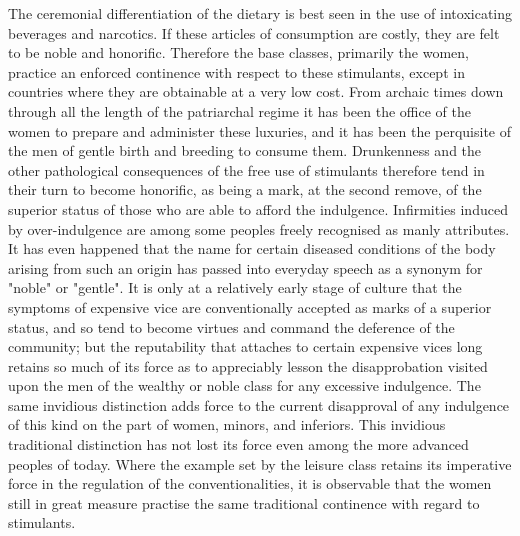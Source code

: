 \documentclass[12pt]{report}
\begin{document}
The ceremonial differentiation of the dietary is best seen in the use of
intoxicating beverages and narcotics. If these articles of consumption
are costly, they are felt to be noble and honorific. Therefore the
base classes, primarily the women, practice an enforced continence
with respect to these stimulants, except in countries where they are
obtainable at a very low cost. From archaic times down through all the
length of the patriarchal regime it has been the office of the women to
prepare and administer these luxuries, and it has been the perquisite
of the men of gentle birth and breeding to consume them. Drunkenness
and the other pathological consequences of the free use of stimulants
therefore tend in their turn to become honorific, as being a mark,
at the second remove, of the superior status of those who are able to
afford the indulgence. Infirmities induced by over-indulgence are among
some peoples freely recognised as manly attributes. It has even happened
that the name for certain diseased conditions of the body arising from
such an origin has passed into everyday speech as a synonym for "noble"
or "gentle". It is only at a relatively early stage of culture that the
symptoms of expensive vice are conventionally accepted as marks of a
superior status, and so tend to become virtues and command the deference
of the community; but the reputability that attaches to certain
expensive vices long retains so much of its force as to appreciably
lesson the disapprobation visited upon the men of the wealthy or noble
class for any excessive indulgence. The same invidious distinction adds
force to the current disapproval of any indulgence of this kind on
the part of women, minors, and inferiors. This invidious traditional
distinction has not lost its force even among the more advanced peoples
of today. Where the example set by the leisure class retains its
imperative force in the regulation of the conventionalities, it is
observable that the women still in great measure practise the same
traditional continence with regard to stimulants.
\end{document}
